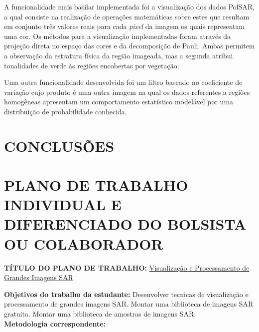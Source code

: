 \documentclass[12pt,letterpaper]{article}
\begin{document}
A funcionalidade mais basilar implementada foi a visualização dos dados PolSAR, a qual consiste na realização de operações matemáticas sobre estes que resultam em conjunto três valores reais para cada \textit{pixel} da imagem os quais representam uma cor. Os métodos para a visualização implementadas foram através da projeção direta no espaço das cores e da decomposição de Pauli. Ambas permitem a observação da estratura física da região imageada, mas a segunda atribui tonalidades de verde às regiões encobertas por vegetação. 

Uma outra funcionalidade desenvolvida foi um filtro baseado no coeficiente de variação cujo produto é uma outra imagem na qual os dados referentes a regiões homogêneas apresentam um comportamento estatístico modelável por uma distribuição de probabilidade conhecida.



  
  \newpage
\section*{\centering \textbf{CONCLUSÕES}} %



  
  \newpage




  
  \newpage

\section*{\centering \textbf{PLANO DE TRABALHO INDIVIDUAL E DIFERENCIADO DO BOLSISTA OU COLABORADOR}} %

\textbf{TÍTULO DO PLANO DE TRABALHO:} \underline{Visualização e Processamento de Grandes Imagens SAR}

\textbf{Objetivos do trabalho da estudante:} Desenvolver tecnicas de visualização e processamento de grandes imagens SAR. Montar uma biblioteca de imagens SAR gratuita. Montar uma biblioteca de amostras de imagens SAR.\\

\textbf{Metodologia correspondente:}
\end{document}
